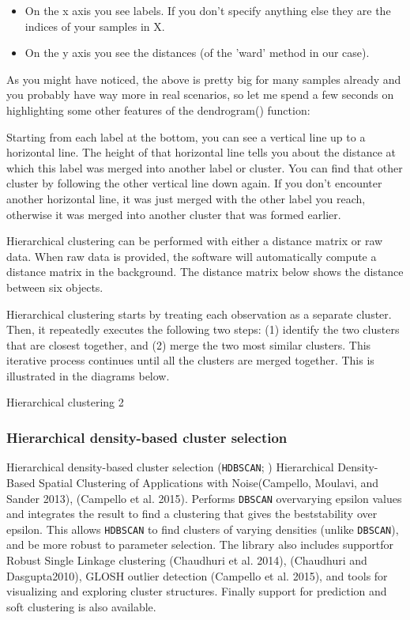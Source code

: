 \documentclass[fleqn,usenatbib]{mnras}
\begin{document}
\begin{itemize}
  
     \item On the x axis you see labels. If you don't specify anything else they
       are the indices of your samples in X.
     \item On the y axis you see the distances (of the 'ward' method in our case).
       
\end{itemize}



As you might have noticed, the above is pretty big for many samples already and you
probably have way more in real scenarios, so let me spend a few seconds on highlighting
some other features of the dendrogram() function:


Starting from each label at the bottom, you can see a vertical line up to a
horizontal line. The height of that horizontal line tells you about the distance
at which this label was merged into another label or cluster. You can find that
other cluster by following the other vertical line down again. If you don't
encounter another horizontal line, it was just merged with the other label
you reach, otherwise it was merged into another cluster that was formed earlier.

Hierarchical clustering can be performed with either a distance matrix or raw data.
When raw data is provided, the software will automatically compute a distance
matrix in the background. The distance matrix below shows the distance between
six objects.

Hierarchical clustering starts by treating each observation as a separate cluster.
Then, it repeatedly executes the following two steps: (1) identify the two
clusters that are closest together, and (2) merge the two most similar clusters.
This iterative process continues until all the clusters are merged together.
This is illustrated in the diagrams below.

Hierarchical clustering 2

\subsubsection{Hierarchical density-based cluster selection}
\label{sec:hdbscan}

Hierarchical density-based cluster selection (\texttt{HDBSCAN}; \citealp{McInnes:2017})
Hierarchical Density-Based Spatial Clustering of Applications with Noise(Campello,
Moulavi, and Sander 2013), (Campello et al. 2015). Performs \texttt{DBSCAN} overvarying
epsilon values and integrates the result to find a clustering that gives the beststability
over epsilon. This allows \texttt{HDBSCAN} to find clusters of varying densities
(unlike \texttt{DBSCAN}), and be more robust to parameter selection. The library also
includes supportfor Robust Single Linkage clustering (Chaudhuri et al. 2014),
(Chaudhuri and Dasgupta2010), GLOSH outlier detection (Campello et al. 2015), and
tools for visualizing and exploring cluster structures. Finally support for prediction
and soft clustering is also available.
\end{document}

